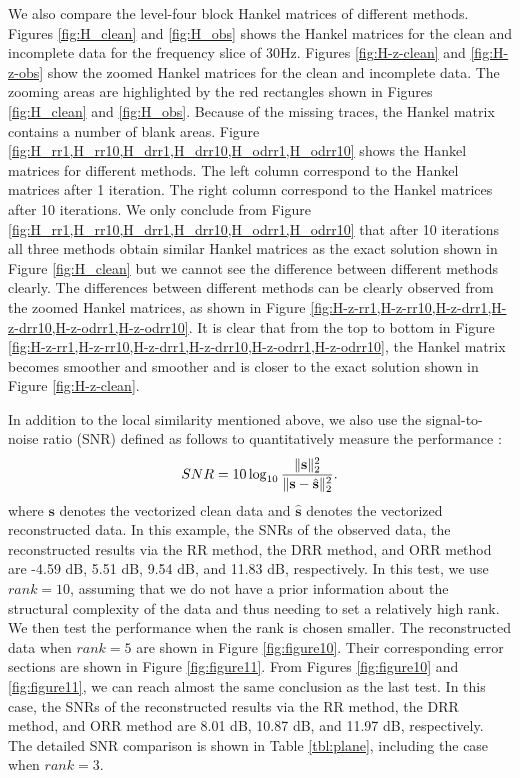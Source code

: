 We also compare the level-four block Hankel matrices of different methods. Figures \ref{fig:H_clean} and \ref{fig:H_obs} shows the Hankel matrices for the clean and incomplete data for the frequency slice of 30Hz. Figures \ref{fig:H-z-clean} and \ref{fig:H-z-obs} show the zoomed Hankel matrices for the clean and incomplete data. The zooming areas are highlighted by the red rectangles shown in Figures \ref{fig:H_clean} and \ref{fig:H_obs}. Because of the missing traces, the Hankel matrix contains a number of blank areas. Figure \ref{fig:H_rr1,H_rr10,H_drr1,H_drr10,H_odrr1,H_odrr10} shows the Hankel matrices for different methods. The left column correspond to the Hankel matrices after 1 iteration. The right column correspond to the Hankel matrices after 10 iterations. We only conclude from Figure \ref{fig:H_rr1,H_rr10,H_drr1,H_drr10,H_odrr1,H_odrr10} that after 10 iterations all three methods obtain similar Hankel matrices as the exact solution shown in Figure \ref{fig:H_clean} but we cannot see the difference between different methods clearly. The differences between different methods can be clearly observed from the zoomed Hankel matrices, as shown in Figure \ref{fig:H-z-rr1,H-z-rr10,H-z-drr1,H-z-drr10,H-z-odrr1,H-z-odrr10}. It is clear that from the top to bottom in Figure \ref{fig:H-z-rr1,H-z-rr10,H-z-drr1,H-z-drr10,H-z-odrr1,H-z-odrr10}, the Hankel matrix becomes smoother and smoother and is closer to the exact solution shown in Figure \ref{fig:H-z-clean}. 

In addition to the local similarity mentioned above, we also use the signal-to-noise ratio (SNR) defined as follows to quantitatively measure the performance \cite[]{weilin2016,yangkang2017sgk,weilin2017gji}:
\begin{equation}
\label{eq:dsnr}
SNR=10\log_{10}\frac{\Arrowvert \mathbf{s} \Arrowvert_2^2}{\Arrowvert \mathbf{s} -\hat{\mathbf{s}}\Arrowvert_2^2}.
\end{equation}
where $\mathbf{s}$ denotes the vectorized clean data and $\hat{\mathbf{s}}$ denotes the vectorized reconstructed data. In this example, the SNRs of the observed data, the reconstructed results via the RR method, the DRR method, and ORR method are -4.59 dB, 5.51 dB, 9.54 dB, and 11.83 dB, respectively. In this test, we use $rank=10$, assuming that we do not have a prior information about the structural complexity of the data and thus needing to set a relatively high rank. We then test the performance when the rank is chosen smaller. The reconstructed data when $rank=5$ are shown in Figure \ref{fig:figure10}. Their corresponding error sections are shown in Figure \ref{fig:figure11}. From Figures \ref{fig:figure10} and \ref{fig:figure11}, we can reach almost the same conclusion as the last test. In this case, the SNRs of the reconstructed results via the RR method, the DRR method, and ORR method are 8.01 dB, 10.87 dB, and 11.97 dB, respectively. The detailed SNR comparison is shown in Table \ref{tbl:plane}, including the case when $rank=3$. 



